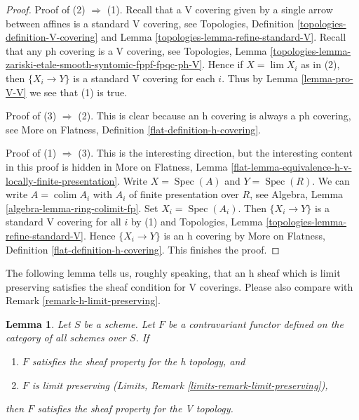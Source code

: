 \documentclass{stacks-project}
\theoremstyle{plain}
\newtheorem{lemma}[subsection]{Lemma}
\theoremstyle{definition}
\theoremstyle{remark}
\numberwithin{equation}{subsection}
\def\lim{\mathop{\mathrm{lim}}\nolimits}
\def\colim{\mathop{\mathrm{colim}}\nolimits}
\def\Spec{\mathop{\mathrm{Spec}}}
\begin{document}
\begin{proof}
Proof of (2) $\Rightarrow$ (1). Recall that a V covering given by a
single arrow between affines is a standard V covering, see
Topologies, Definition \ref{topologies-definition-V-covering} and
Lemma \ref{topologies-lemma-refine-standard-V}.
Recall that any ph covering is a V covering, see
Topologies, Lemma
\ref{topologies-lemma-zariski-etale-smooth-syntomic-fppf-fpqc-ph-V}.
Hence if $X = \lim X_i$ as in (2), then $\{X_i \to Y\}$
is a standard V covering for each $i$. Thus by
Lemma \ref{lemma-pro-V-V} we see that (1) is true.

\medskip\noindent
Proof of (3) $\Rightarrow$ (2). This is clear because an h covering
is always a ph covering, see
More on Flatness, Definition \ref{flat-definition-h-covering}.

\medskip\noindent
Proof of (1) $\Rightarrow$ (3). This is the interesting direction, but
the interesting content in this proof is hidden in More on Flatness, Lemma
\ref{flat-lemma-equivalence-h-v-locally-finite-presentation}.
Write $X = \Spec(A)$ and $Y = \Spec(R)$. We can write
$A = \colim A_i$ with $A_i$ of finite presentation over $R$, see
Algebra, Lemma \ref{algebra-lemma-ring-colimit-fp}.
Set $X_i = \Spec(A_i)$. Then $\{X_i \to Y\}$ is a standard V covering
for all $i$ by (1) and
Topologies, Lemma \ref{topologies-lemma-refine-standard-V}.
Hence $\{X_i \to Y\}$ is an h covering by
More on Flatness, Definition \ref{flat-definition-h-covering}.
This finishes the proof.
\end{proof}

\noindent
The following lemma tells us, roughly speaking, that an h sheaf
which is limit preserving satisfies the sheaf condition for V coverings.
Please also compare with Remark \ref{remark-h-limit-preserving}.

\begin{lemma}
\label{lemma-h-limit-preserving}
Let $S$ be a scheme. Let $F$ be a contravariant functor defined
on the category of all schemes over $S$. If
\begin{enumerate}
\item $F$ satisfies the sheaf property for the h topology, and
\item $F$ is limit preserving
(Limits, Remark \ref{limits-remark-limit-preserving}),
\end{enumerate}
then $F$ satisfies the sheaf property for the V topology.
\end{lemma}
\end{document}
